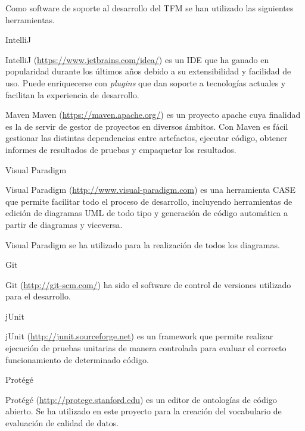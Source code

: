 Como software de soporte al desarrollo del \acs{TFM} se han utilizado las
siguientes herramientas. 

\begin{definitionlist} 
\item[IntelliJ]

  IntelliJ (\url{https://www.jetbrains.com/idea/}) es un \acf{IDE} que ha ganado
  en popularidad durante los últimos años debido a su extensibilidad y facilidad
  de uso. Puede enriquecerse con \textit{plugins} que dan soporte a tecnologías
  actuales y facilitan la experiencia de desarrollo. 

\label{maven}
\item[Maven]
  Maven (\url{https://maven.apache.org/}) es un proyecto apache cuya finalidad es
  la de servir de gestor de proyectos en diversos ámbitos. Con Maven es fácil
  gestionar las distintas dependencias entre artefactos, ejecutar código,
  obtener informes de resultados de pruebas y empaquetar los resultados. 

\item[Visual Paradigm]

  Visual Paradigm (\url{http://www.visual-paradigm.com}) es una herramienta
  \acf{CASE} que permite facilitar todo el proceso de desarrollo, incluyendo
  herramientas de edición de diagramas \acs{UML} de todo tipo y generación de
  código automática a partir de diagramas y viceversa. 

  Visual Paradigm se ha utilizado para la realización de todos los diagramas. 

\item[Git]

  
  Git (\url{http://git-scm.com/}) ha sido el software de control de versiones
  utilizado para el desarrollo. 

\item[jUnit]

  jUnit (\url{http://junit.sourceforge.net}) es un framework que permite realizar
  ejecución de pruebas unitarias de manera controlada para evaluar el correcto
  funcionamiento de determinado código. 

\item[Protégé]

  Protégé (\url{http://protege.stanford.edu}) es un editor de ontologías de código
  abierto. Se ha utilizado en este proyecto para la creación del vocabulario de
  evaluación de calidad de datos. 

\end{definitionlist}


